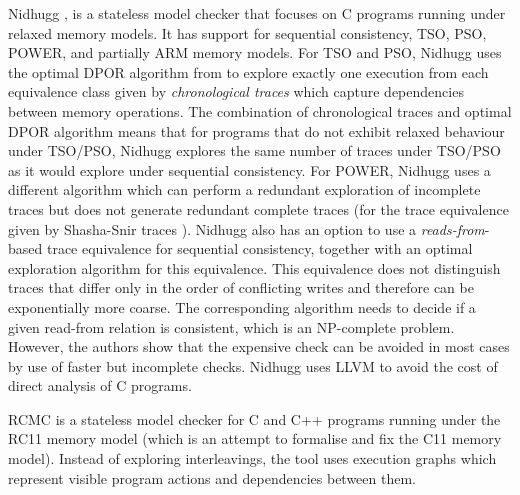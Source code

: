 Nidhugg , is a
stateless model checker that focuses on C programs running under relaxed memory
models.
It has support for sequential consistency, TSO, PSO, POWER, and partially ARM
memory models.
For TSO and PSO, Nidhugg uses the optimal DPOR algorithm from  to explore exactly one execution from each equivalence class given by \emph{chronological traces} which capture dependencies between memory operations.
The combination of chronological traces and optimal DPOR algorithm means that
for programs that do not exhibit relaxed behaviour under TSO/PSO, Nidhugg
explores the same number of traces under TSO/PSO as it would explore under
sequential consistency.
For POWER, Nidhugg uses a different algorithm which can perform a redundant exploration of incomplete traces but does not generate redundant complete traces (for the trace equivalence given by Shasha-Snir traces ).
Nidhugg also has an option to use a \emph{reads-from}-based trace equivalence for sequential consistency, together with an optimal exploration algorithm for this equivalence.
This equivalence does not distinguish traces that differ only in the order of conflicting writes and therefore can be exponentially more coarse.
The corresponding algorithm needs to decide if a given read-from relation is consistent, which is an NP-complete problem.
However, the authors show that the expensive check can be avoided in most cases by use of faster but incomplete checks.
Nidhugg uses LLVM to avoid the cost of direct analysis of C programs.


RCMC  is a stateless model checker for C and C++ programs running under the RC11 memory model  (which is an attempt to formalise and fix the C11 memory model).
Instead of exploring interleavings, the tool uses execution graphs which represent visible program actions and dependencies between them.


